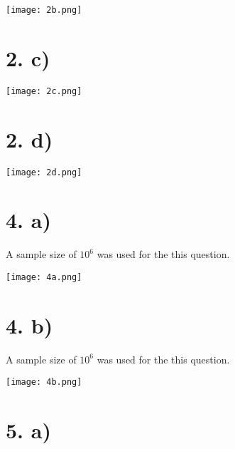 \documentclass{article}
\begin{document}
\begin{center}
    \texttt{[image: 2b.png]}
\end{center}

\section*{2. c)}

\begin{center}
    \texttt{[image: 2c.png]}
\end{center}

\section*{2. d)}

\begin{center}
    \texttt{[image: 2d.png]}
\end{center}

\section*{4. a)}

A sample size of $10^6$ was used for the this question.
\begin{center}
    \texttt{[image: 4a.png]}
\end{center}

\section*{4. b)}

A sample size of $10^6$ was used for the this question.
\begin{center}
    \texttt{[image: 4b.png]}
\end{center}

\section*{5. a)}
\end{document}
